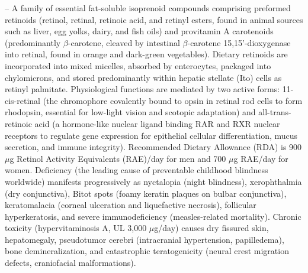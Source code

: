 -- A family of essential fat-soluble isoprenoid compounds comprising preformed retinoids (retinol, retinal, retinoic acid, and retinyl esters, found in animal sources such as liver, egg yolks, dairy, and fish oils) and provitamin A carotenoids (predominantly $\beta$-carotene, cleaved by intestinal $\beta$-carotene 15,15'-dioxygenase into retinal, found in orange and dark-green vegetables). Dietary retinoids are incorporated into mixed micelles, absorbed by enterocytes, packaged into chylomicrons, and stored predominantly within hepatic stellate (Ito) cells as retinyl palmitate. Physiological functions are mediated by two active forms: 11-cis-retinal (the chromophore covalently bound to opsin in retinal rod cells to form rhodopsin, essential for low-light vision and scotopic adaptation) and all-trans-retinoic acid (a hormone-like nuclear ligand binding RAR and RXR nuclear receptors to regulate gene expression for epithelial cellular differentiation, mucus secretion, and immune integrity). Recommended Dietary Allowance (RDA) is 900 $\mu$g Retinol Activity Equivalents (RAE)/day for men and 700 $\mu$g RAE/day for women. Deficiency (the leading cause of preventable childhood blindness worldwide) manifests progressively as nyctalopia (night blindness), xerophthalmia (dry conjunctiva), Bitot spots (foamy keratin plaques on bulbar conjunctiva), keratomalacia (corneal ulceration and liquefactive necrosis), follicular hyperkeratosis, and severe immunodeficiency (measles-related mortality). Chronic toxicity (hypervitaminosis A, UL 3,000 $\mu$g/day) causes dry fissured skin, hepatomegaly, pseudotumor cerebri (intracranial hypertension, papilledema), bone demineralization, and catastrophic teratogenicity (neural crest migration defects, craniofacial malformations).

